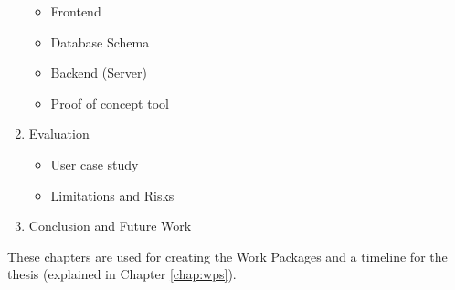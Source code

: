 \begin{enumerate}
\begin{itemize}
		\item Frontend
		\item Database Schema
		\item Backend (Server)
		\item Proof of concept tool
	\end{itemize}
	\item Evaluation
	\begin{itemize}
		\item User case study
		\item Limitations and Risks
	\end{itemize}
	\item Conclusion and Future Work
\end{enumerate}

These chapters are used for creating the Work Packages and a timeline for the thesis (explained in Chapter \ref{chap:wps}).